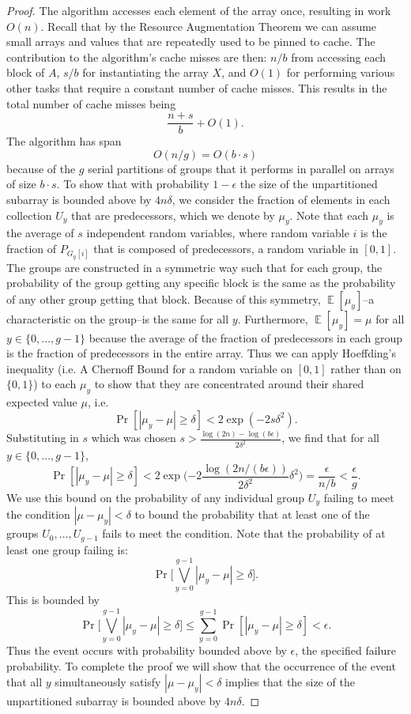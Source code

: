 \documentclass[twocolumn, twoside, 11pt]{article}
\def\E{\operatorname{\mathbb{E}}}
\def\Pr{\operatorname{Pr}}
\begin{document}
\begin{proof}
	The algorithm accesses each element of the array once, resulting in work $O(n)$.
	Recall that by the Resource Augmentation Theorem we can assume small arrays and values that are repeatedly used to be pinned to cache.
	The contribution to the algorithm's cache misses are then:
	$n/b$ from accessing each block of $A$, $s/b$ for instantiating the array $X$, and $O(1)$ for performing various other tasks that require a constant number of cache misses. 
	This results in the total number of cache misses being $$\frac{n+s}{b}+O(1).$$
	The algorithm has span $$O(n/g) = O(b\cdot s) $$
	because of the $g$ serial partitions of groups that it performs in parallel on arrays of size $b\cdot s$.
	To show that with probability $1-\epsilon$ the size of the unpartitioned subarray is bounded above by $4n\delta$, we consider the fraction of elements in each collection $U_y$ that are predecessors, which we denote by $\mu_y$.
	Note that each $\mu_y$ is the average of $s$ independent random variables, where random variable $i$ is the fraction of $P_{G_y[i]}$ that is composed of predecessors, a random variable in $[0, 1]$.
	The groups are constructed in a symmetric way such that for each group, the probability of the group getting any specific block is the same as the probability of any other group getting that block. 
	Because of this symmetry, $\E[\mu_y]$--a characteristic on the group--is the same for all $y$.
	Furthermore, $\E[\mu_y] = \mu$ for all $y \in \{0,\ldots,g-1\}$ because the average of the fraction of predecessors in each group is the fraction of predecessors in the entire array.	
	Thus we can apply Hoeffding's inequality (i.e. A Chernoff Bound for a random variable on $[0,1]$ rather than on $\{0,1\}$) to each $\mu_y$ to show that they are concentrated around their shared expected value $\mu$, i.e.
	$$\Pr[|\mu_y - \mu| \geq \delta] < 2\exp(-2s\delta^2). $$
	Substituting in $s$ which was chosen $s > \frac{\log (2n) -\log (b\epsilon)}{2\delta^2}$, we find that for all $y \in \{0,\ldots, g-1\}$, 
	$$\Pr[|\mu_y - \mu| \geq \delta] < 2\exp\Big({-2} \frac{\log (2n/(b\epsilon))}{2\delta^2} \delta^2\Big) = \frac{\epsilon}{n/b} < \frac{\epsilon}{g}. $$
	We use this bound on the probability of any individual group $U_y$ failing to meet the condition $|\mu-\mu_y| < \delta$ to bound the probability that at least one of the groups $U_0, \ldots, U_{g-1}$ fails to meet the condition.
	Note that the probability of at least one group failing is: 
	$$\Pr\Big[\bigvee_{y=0}^{g-1} |\mu_y - \mu| \geq \delta\Big].$$
	This is bounded by 
	$$\Pr\Big[\bigvee_{y=0}^{g-1} |\mu_y - \mu| \geq \delta\Big] \leq \sum_{y=0}^{g-1} \Pr[|\mu_y - \mu| \geq \delta] < \epsilon.$$
Thus the event occurs with probability bounded above by $\epsilon$, the specified failure probability.
To complete the proof we will show that the occurrence of the event that all $y$ simultaneously satisfy $|\mu - \mu_y| < \delta$ implies that the size of the unpartitioned subarray is bounded above by $4n\delta$.


\end{proof}
\end{document}
